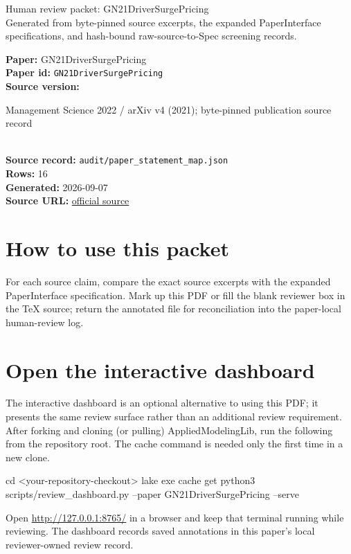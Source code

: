 \documentclass[10pt]{article}
\begin{document}
\fontsize{9}{10}\selectfont

\begin{center}
{\LARGE Human review packet: GN21DriverSurgePricing}\\[0.35em]
\small Generated from byte-pinned source excerpts, the expanded PaperInterface
specifications, and hash-bound raw-source-to-Spec screening records.
\end{center}

\noindent\textbf{Paper:} GN21DriverSurgePricing\\
\textbf{Paper id:} \texttt{GN21DriverSurgePricing}\\
\textbf{Source version:} \parbox[t]{0.76\linewidth}{\raggedright Management Science 2022 / arXiv v4 (2021); byte-pinned publication source record}\\
\textbf{Source record:} \texttt{audit/paper\_statement\_map.json}\\
\textbf{Rows:} 16\\
\textbf{Generated:} 2026-09-07\\
\textbf{Source URL:} \href{https://arxiv.org/pdf/1905.07544}{official source}





\section*{How to use this packet}
For each source claim, compare the exact source excerpts with the expanded
PaperInterface specification. Mark up this PDF or fill the blank reviewer box in the TeX source;
return the annotated file for reconciliation into the paper-local human-review
log.

\section*{Open the interactive dashboard}
The interactive dashboard is an optional alternative to using this PDF; it
presents the same review surface rather than an additional review requirement.
After forking and cloning (or pulling) AppliedModelingLib, run the following from the
repository root. The cache command is needed only the first time in a new clone.
\begin{ReviewVerbatim}
cd <your-repository-checkout>
lake exe cache get
python3 scripts/review_dashboard.py --paper GN21DriverSurgePricing --serve
\end{ReviewVerbatim}
Open \url{http://127.0.0.1:8765/} in a browser and keep that terminal running
while reviewing. The dashboard records saved annotations in this paper's local
reviewer-owned review record.
\end{document}
